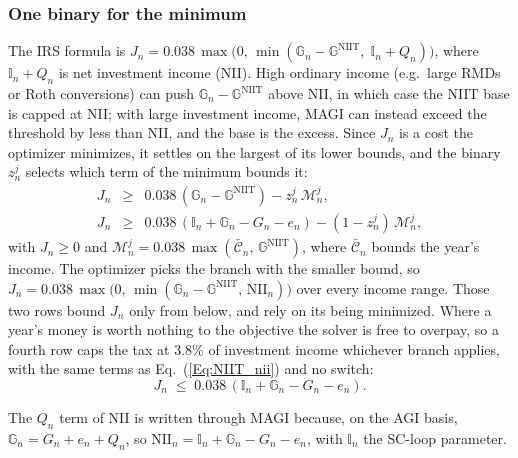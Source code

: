 \documentclass[fleqn,12pt]{report}
\begin{document}
	\subsubsection*{One binary for the minimum}
	The IRS formula is
	$J_n = 0.038\,\max\!\bigl(0,\,\min(\mathbb{G}_n - \mathbb{G}^{\mathrm{NIIT}},\;\mathbb{I}_n + Q_n)\bigr)$,
	where $\mathbb{I}_n + Q_n$ is net investment income (NII).
	High ordinary income (e.g.\ large RMDs or Roth conversions) can push
	$\mathbb{G}_n - \mathbb{G}^{\mathrm{NIIT}}$ above NII, in which case the NIIT
	base is capped at NII; with large investment income, MAGI can instead exceed the
	threshold by less than NII, and the base is the excess.
	Since $J_n$ is a cost the optimizer minimizes, it settles on the largest of its
	lower bounds, and the binary $z^j_n$ selects which term of the minimum bounds it:
	\begin{eqnarray}
		J_n &\ge& 0.038\,(\mathbb{G}_n - \mathbb{G}^{\mathrm{NIIT}}) - z^j_n\,\mathcal{M}^j_n, \label{Eq:NIIT_excess} \\
		J_n &\ge& 0.038\,(\mathbb{I}_n + \mathbb{G}_n - G_n - e_n) - (1-z^j_n)\,\mathcal{M}^j_n, \label{Eq:NIIT_nii}
	\end{eqnarray}
	with $J_n \ge 0$ and $\mathcal{M}^j_n = 0.038\,\max(\bar{\mathcal{C}}_n,\,\mathbb{G}^{\mathrm{NIIT}})$,
	where $\bar{\mathcal{C}}_n$ bounds the year's income.
	The optimizer picks the branch with the smaller bound, so
	$J_n = 0.038\,\max\!\bigl(0,\,\min(\mathbb{G}_n - \mathbb{G}^{\mathrm{NIIT}},\,\mathrm{NII}_n)\bigr)$
	over every income range.
	Those two rows bound $J_n$ only from below, and rely on its being minimized.  Where a
	year's money is worth nothing to the objective the solver is free to overpay, so a fourth
	row caps the tax at 3.8\% of investment income whichever branch applies, with the same
	terms as Eq.~(\ref{Eq:NIIT_nii}) and no switch:
	\begin{equation}
		\label{Eq:NIIT_cap}
		J_n \;\le\; 0.038\,(\mathbb{I}_n + \mathbb{G}_n - G_n - e_n).
	\end{equation}

	The $Q_n$ term of NII is written through MAGI because, on the AGI basis,
	$\mathbb{G}_n = G_n + e_n + Q_n$, so $\mathrm{NII}_n = \mathbb{I}_n + \mathbb{G}_n - G_n - e_n$,
	with $\mathbb{I}_n$ the SC-loop parameter.
\end{document}
